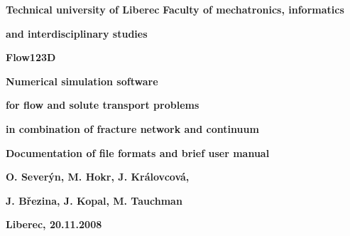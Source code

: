 \documentclass[12pt,a4paper]{report}
\begin{document}
\thispagestyle{empty}
\begin{center}
\noindent \textbf{\LARGE{Technical university of Liberec}}
\noindent \textbf{\LARGE{Faculty of mechatronics, informatics}}

\noindent \textbf{\LARGE{and interdisciplinary studies}}

\vspace{160pt}

 \textbf{\huge{Flow123D}}

\textbf{\large{Numerical simulation software}}

\textbf{\large{for flow and solute transport problems}}

\textbf{\large{in combination of fracture network and continuum}}

\vspace{20pt}

 \textbf{\large{Documentation of file formats and brief user manual}}

\vspace{20pt}

 \textbf{\Large{O. Sever\'yn, M. Hokr, J. Kr\'alovcov\'a,}}

 \textbf{\Large{ J. B\v rezina, J. Kopal, M. Tauchman }}

\vspace{210pt}

\noindent \textbf{\Large{Liberec, 20.11.2008}}
\end{center}
\noindent 

\noindent

 

 


 
  
   
\end{document}
